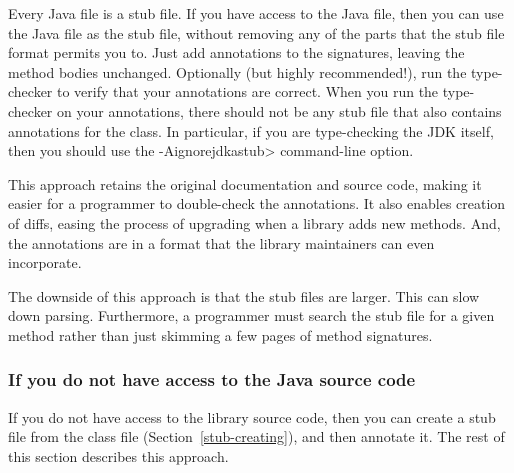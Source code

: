 Every Java file is a stub file.  If you have access to the Java file, then
you can use the Java file as the stub file, without removing
any of the parts that the stub file format permits you to.  Just add
annotations to the signatures, leaving the method bodies unchanged.
Optionally (but highly recommended!), run the type-checker to verify that
your annotations are correct.  When you run the type-checker on your
annotations, there should not be any stub file that also contains
annotations for the class.  In particular, if you are type-checking the JDK
itself, then you should use the \<-Aignorejdkastub> command-line option.

This approach retains the original
documentation and source code, making it easier for a programmer to
double-check the annotations.  It also enables creation of diffs, easing
the process of upgrading when a library adds new methods.  And, the
annotations are in a format that the library maintainers can even
incorporate.

The downside of this approach is that the stub files are larger.  This can
slow down parsing.  Furthermore, a programmer must search the stub file
for a given method rather than just skimming a few pages of method signatures.


\subsubsection{If you do not have access to the Java source code}

If you do not have access to the library source code, then you can create a
stub file from the class file (Section~\ref{stub-creating}),
and then annotate it.  The rest of this section describes this approach.


